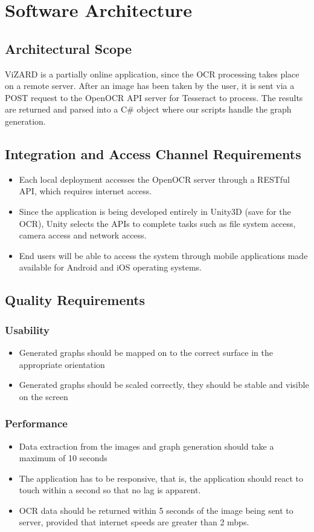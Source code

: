 \documentclass[a4paper,12pt]{article}
\begin{document}
\newpage
\section{Software Architecture}
\subsection{Architectural Scope}
ViZARD is a partially online application, since the OCR processing takes place on a remote server. After an image has been taken by the user, it is sent via a POST request to the OpenOCR API server for Tesseract to process. The results are returned and parsed into a C\# object where our scripts handle the graph generation.

\subsection{Integration and Access Channel Requirements}
\begin{itemize}
\item Each local deployment accesses the OpenOCR server through a RESTful API, which requires internet access.
\item  Since the application is being developed entirely in Unity3D (save for the OCR), Unity selects the APIs to complete tasks such as file system access, camera access and network access.
\item End users will be able to access the system through mobile applications made available for Android and iOS operating systems.
\end{itemize}

\subsection{Quality Requirements}
\subsubsection*{Usability}
\begin{itemize}		
	\item Generated graphs should be mapped on to the correct surface in the appropriate orientation
	\item Generated graphs should be scaled correctly, they should be stable and visible on the screen
\end{itemize}
\subsubsection*{Performance}	
\begin{itemize}		
	\item Data extraction from the images and graph generation should take a maximum of 10 seconds
	\item The application has to be responsive, that is, the application should react to touch within a second so that no lag is apparent.
	\item OCR data should be returned within 5 seconds of the image being sent to server, provided that internet speeds are greater than 2 mbps.	
\end{itemize}
\end{document}
